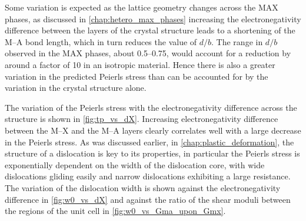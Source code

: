 Some variation is expected as the lattice geometry changes across the MAX phases, as discussed in \autoref{chap:hetero_max_phases} increasing the electronegativity difference between the layers of the crystal structure leads to a shortening of the M--A bond length, which in turn reduces the value of $d/b$. The range in $d/b$ observed in the MAX phases, about \numrange{0.5}{0.75}, would account for a reduction by around a factor of \num{10} in an isotropic material. Hence there is also a greater variation in the predicted Peierls stress than can be accounted for by the variation in the crystal structure alone. 


The variation of the Peierls stress with the electronegativity difference across the structure is shown in \autoref{fig:tp_vs_dX}. Increasing electronegativity difference between the M--X and the M--A layers clearly correlates well with a large decrease in the Peierls stress. As was discussed earlier, in \autoref{chap:plastic_deformation}, the structure of a dislocation is key to its properties, in particular the Peierls stress is exponentially dependent on the width of the dislocation core, with wide dislocations gliding easily and narrow dislocations exhibiting a large resistance. The variation of the dislocation width is shown against the electronegativity difference in \autoref{fig:w0_vs_dX} and against the ratio of the shear moduli between the regions of the unit cell in \autoref{fig:w0_vs_Gma_upon_Gmx}.




